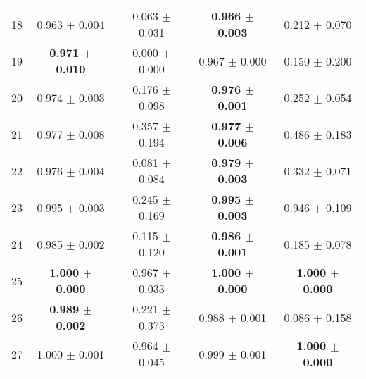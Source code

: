 \begin{table}[!ht]
{\begin{tabular}{r c c c c}
18 & 0.963 $\pm$ 0.004 & 0.063 $\pm$ 0.031 & \textbf{0.966 $\pm$ 0.003} & 0.212 $\pm$ 0.070 \\
19 & \textbf{0.971 $\pm$ 0.010} & 0.000 $\pm$ 0.000 & 0.967 $\pm$ 0.000 & 0.150 $\pm$ 0.200 \\
20 & 0.974 $\pm$ 0.003 & 0.176 $\pm$ 0.098 & \textbf{0.976 $\pm$ 0.001} & 0.252 $\pm$ 0.054 \\
21 & 0.977 $\pm$ 0.008 & 0.357 $\pm$ 0.194 & \textbf{0.977 $\pm$ 0.006} & 0.486 $\pm$ 0.183 \\
22 & 0.976 $\pm$ 0.004 & 0.081 $\pm$ 0.084 & \textbf{0.979 $\pm$ 0.003} & 0.332 $\pm$ 0.071 \\
23 & 0.995 $\pm$ 0.003 & 0.245 $\pm$ 0.169 & \textbf{0.995 $\pm$ 0.003} & 0.946 $\pm$ 0.109 \\
24 & 0.985 $\pm$ 0.002 & 0.115 $\pm$ 0.120 & \textbf{0.986 $\pm$ 0.001} & 0.185 $\pm$ 0.078 \\
25 & \textbf{1.000 $\pm$ 0.000} & 0.967 $\pm$ 0.033 & \textbf{1.000 $\pm$ 0.000} & \textbf{1.000 $\pm$ 0.000} \\
26 & \textbf{0.989 $\pm$ 0.002} & 0.221 $\pm$ 0.373 & 0.988 $\pm$ 0.001 & 0.086 $\pm$ 0.158 \\
27 & 1.000 $\pm$ 0.001 & 0.964 $\pm$ 0.045 & 0.999 $\pm$ 0.001 & \textbf{1.000 $\pm$ 0.000} \\
\end{tabular}}
\end{table}
